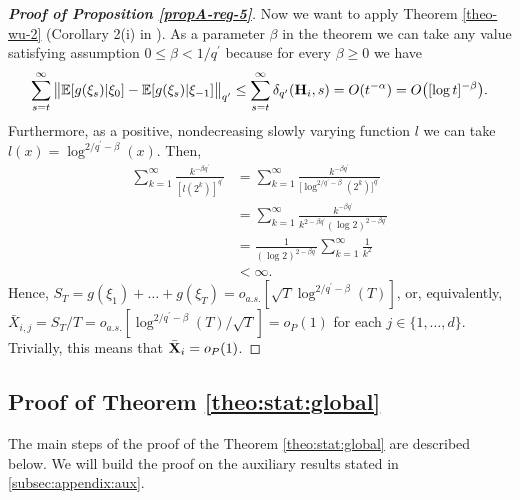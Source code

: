 \documentclass[a4paper,12pt]{article}
\begin{document}
\begin{proof}[\textnormal{\textbf{Proof of Proposition \ref{propA-reg-5}}}]
Now we want to apply Theorem \ref{theo-wu-2} (Corollary 2(i) in \cite{Wu2007}). As a parameter $\beta$ in the theorem we can take any value satisfying assumption $0 \leq \beta < 1/{q^\prime}$ because for every $\beta \geq 0$ we have 
\begin{align*}
\sum_{s = t}^\infty \big\lVert \mathbb{E} [g(\xi_s)| \xi_0] - \mathbb{E} [g(\xi_s)| \xi_{-1}]\big\lVert_{q^\prime} \leq \sum_{s = t}^\infty \delta_{q^\prime}(\mathbf{H}_i, s) =O(t^{-\alpha}) = O\big([\log t]^{-\beta}\big).
\end{align*}
Furthermore, as a positive, nondecreasing slowly varying function $\mathit{l}$ we can take \linebreak $\mathit{l}(x) = \log^{2/{q^\prime} - \beta}(x)$. Then,
\begin{align*}
\sum_{k=1}^\infty \frac{k^{-\beta q^\prime}}{[l(2^k)]^{q^\prime}} &= \sum_{k=1}^\infty \frac{k^{-\beta  q^\prime}}{\big[\log^{2/{q^\prime} - \beta}(2^k)\big]^{q^\prime}} \\
&= \sum_{k=1}^\infty \frac{k^{-\beta  q^\prime}}{k^{2 -\beta q^\prime }(\log 2)^{2 - \beta q^\prime}} \\
&= \frac{1}{(\log 2)^{2 - \beta q^\prime}}\sum_{k=1}^\infty \frac{1}{k^2} \\
&< \infty.
\end{align*}
Hence, $S_T = g(\xi_1) + \ldots + g(\xi_T) = o_{a.s.}[\sqrt{T}\log^{2/{q^\prime} - \beta}(T)]$, or, equivalently, \linebreak $\bar{X}_{i, j} = S_T/T = o_{a.s.}[\log^{2/{q^\prime} - \beta}(T)/\sqrt{T}] = o_P(1)$ for each $j \in \{1, \ldots, d\}$. Trivially, this means that $\bar{\mathbf{X}}_i = o_P(1)$.
\end{proof}



\subsection{Proof of Theorem \ref{theo:stat:global}}\label{subsec-appendix-stat-equality}

The main steps of the proof of the Theorem \ref{theo:stat:global} are described below. We will build the proof on the auxiliary results stated in \ref{subsec:appendix:aux}.
 
\end{document}
